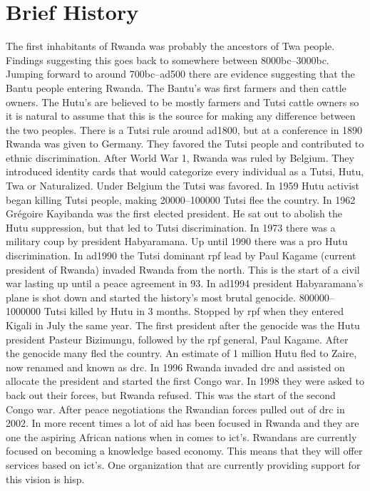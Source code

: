 \section{Brief History}
The first inhabitants of Rwanda was probably the ancestors of Twa people. 
Findings suggesting this goes back to somewhere between 8000\gls{bc}--3000\gls{bc}. 
Jumping forward to around 700\gls{bc}--\gls{ad}500 there are evidence suggesting that the Bantu people entering Rwanda. 
The Bantu's was first farmers and then cattle owners. 
The Hutu's are believed to be mostly farmers and Tutsi cattle owners so it is natural to assume that this is the source for making any difference between the two peoples. 
There is a Tutsi rule around \gls{ad}1800, but at a conference in 1890 Rwanda was given to Germany. 
They favored the Tutsi people and contributed to ethnic discrimination. 
After World War 1, Rwanda was ruled by Belgium. 
They introduced identity cards that would categorize every individual as a Tutsi, Hutu, Twa or Naturalized. 
Under Belgium the Tutsi was favored. 
In 1959 Hutu activist began killing Tutsi people, making 20000--100000 Tutsi flee the country. 
In 1962 Grégoire Kayibanda was the first elected president. 
He sat out to abolish the Hutu suppression, but that led to Tutsi discrimination. 
In 1973 there was a military coup by president Habyaramana. 
Up until 1990 there was a pro Hutu discrimination. 
In \gls{ad}1990 the Tutsi dominant \gls{rpf} lead by Paul Kagame (current president of Rwanda) invaded Rwanda from the north. 
This is the start of a civil war lasting up until a peace agreement in 93. 
In \gls{ad}1994 president Habyaramana's plane is shot down and started the history's most brutal genocide. 
800000--1000000 Tutsi killed by Hutu in 3 months. 
Stopped by \gls{rpf} when they entered Kigali in July the same year. 
The first president after the genocide was the Hutu president Pasteur Bizimungu, followed by the \gls{rpf} general, Paul Kagame. 
After the genocide many fled the country. 
An estimate of 1 million Hutu fled to Zaire, now renamed and known as \gls{drc}. 
In 1996 Rwanda invaded \gls{drc} and assisted on allocate the president and started the first Congo war. 
In 1998 they were asked to back out their forces, but Rwanda refused. 
This was the start of the second Congo war. 
After peace negotiations the Rwandian forces pulled out of \gls{drc} in 2002.
In more recent times a lot of aid has been focused in Rwanda and they are one the aspiring African nations when in comes to \gls{ict}'s.
Rwandans are currently focused on becoming a knowledge based economy. 
This means that they will offer services based on \gls{ict}'s.
One organization that are currently providing support for this vision is \gls{hisp}.
\cite{rw:snl}
\cite{rw:wiki}
\cite{hutututsi:wiki}

